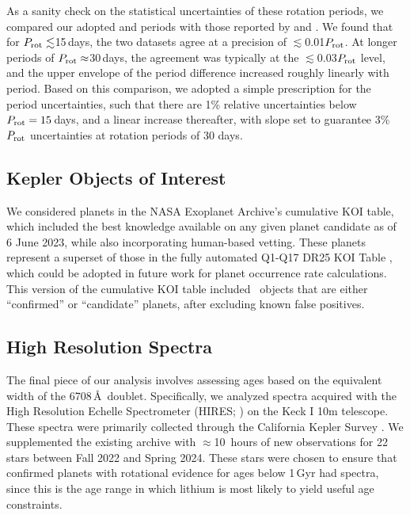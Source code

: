 \documentclass[11pt,twocolumn,tighten]{aastex63}
\begin{document}
As a sanity check on the statistical uncertainties of these rotation
periods, we compared our adopted  and
 periods with those reported by
\citet{McQuillan_2014} and \citet{Mazeh_2015}.  We found that for
$P_{\rm rot}\lesssim$15\,days, the two datasets agree at a precision
of $\lesssim$0.01$P_{\rm rot}$.  At longer periods of $P_{\rm
rot}\approx$30\,days, the agreement was typically at the
$\lesssim$0.03$P_{\rm rot}$ level, and the upper envelope of the
period difference increased roughly linearly with period.  Based on
this comparison, we adopted a simple prescription for the period
uncertainties, such that there are 1\% relative uncertainties below
$P_{\rm rot}=15$\,days, and a linear increase thereafter, with slope
set to guarantee 3\% $P_{\rm rot}$ uncertainties at rotation periods
of 30 days.


\subsection{Kepler Objects of Interest}
\label{subsec:planetsel}

We considered planets in the NASA Exoplanet Archive's cumulative KOI
table, which included the best knowledge available on any given planet
candidate as of 6 June 2023, while also incorporating human-based
vetting. %
These planets represent a superset of those in the fully automated
Q1-Q17 DR25 KOI Table \citep{Thompson_2018}, which could be adopted in
future work for planet occurrence rate calculations.  This version of
the cumulative KOI table included \nkoisnofp\ objects that are either
``confirmed'' or ``candidate'' planets, after excluding known false
positives. 

\subsection{High Resolution Spectra}
\label{subsec:lithiumsel}

The final piece of our analysis involves assessing ages based on the
equivalent width of the  6708\,\AA\ doublet.  Specifically,
we analyzed spectra acquired with the High Resolution Echelle
Spectrometer (HIRES; \citealt{vogt_hires_1994}) on the Keck I 10m
telescope.  These spectra were primarily collected through the
California Kepler Survey
\citep{2017AJ....154..107P,2017AJ....154..108J,2017AJ....154..109F}.
We supplemented the existing archive with $\approx$10~hours of new
observations for 22 stars between Fall 2022 and Spring 2024.  These
stars were chosen to ensure that confirmed planets with rotational
evidence for ages below 1\,Gyr had spectra, since this is the age
range in which lithium is most likely to yield useful age constraints.
\end{document}
